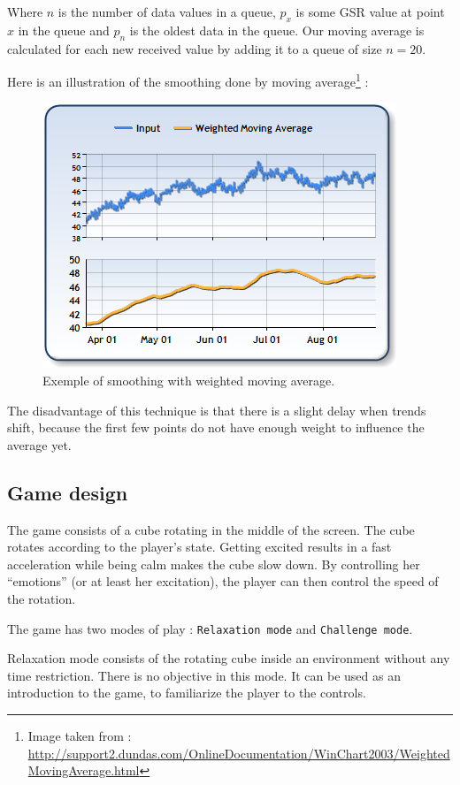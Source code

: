 \documentclass[12pt,a4paper]{article}
\begin{document}
Where $n$ is the number of data values in a queue, $p_x$ is some GSR value at point $x$ in the queue and $p_n$ is the oldest data in the queue. Our moving average is calculated for each new received value by adding it to a queue of size $n=20$.

Here is an illustration of the smoothing done by moving average\footnote{Image taken from : \\ \hyperref[]{http://support2.dundas.com/OnlineDocumentation/WinChart2003/WeightedMovingAverage.html}} :

\begin{figure}[H] 
\centering
\includegraphics{WeightedMovingAverage.png}
\caption{Exemple of smoothing with weighted moving average.}
\end{figure}

The disadvantage of this technique is that there is a slight delay when trends shift, because the first few points do not have enough weight to influence the average yet.

\subsection{Game design}

The game consists of a cube rotating in the middle of the screen. The cube rotates according to the player's state. Getting excited results in a fast acceleration while being calm makes the cube slow down. By controlling her ``emotions'' (or at least her excitation), the player can then control the speed of the rotation.

The game has two modes of play : \texttt{Relaxation mode} and \texttt{Challenge mode}. 

Relaxation mode consists of the rotating cube inside an environment without any time restriction. There is no objective in this mode. It can be used as an introduction to the game, to familiarize the player to the controls. 
\end{document}
